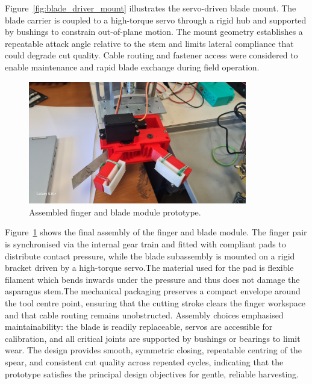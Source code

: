 Figure~\ref{fig:blade_driver_mount} illustrates the servo-driven blade mount. The blade carrier is
coupled to a high-torque servo through a rigid hub and supported by bushings to constrain
out-of-plane motion. The mount geometry establishes a repeatable attack angle relative to the
stem and limits lateral compliance that could degrade cut quality. Cable routing and fastener
access were considered to enable maintenance and rapid blade exchange during field operation.

\begin{figure}[H]
\centering
\includegraphics[width=0.85\textwidth]{Fingerfinal_design.jpg}
\caption{Assembled finger and blade module prototype.}
\label{fig:finger_final}
\end{figure}

Figure~\ref{fig:finger_final} shows the final assembly of the finger and blade module. The finger
pair is synchronised via the internal gear train and fitted with compliant pads to distribute
contact pressure, while the blade subassembly is mounted on a rigid bracket driven by a
high-torque servo.The material used for the pad is flexible filament which bends inwards under the pressure and thus does not damage the asparagus stem.The mechanical packaging preserves a compact envelope around the tool
centre point, ensuring that the cutting stroke clears the finger workspace and that cable
routing remains unobstructed. Assembly choices emphasised maintainability: the blade is
readily replaceable, servos are accessible for calibration, and all critical joints are supported by
bushings or bearings to limit wear. The design provides smooth, symmetric closing,
repeatable centring of the spear, and consistent cut quality across repeated cycles, indicating
that the prototype satisfies the principal design objectives for gentle, reliable harvesting.




